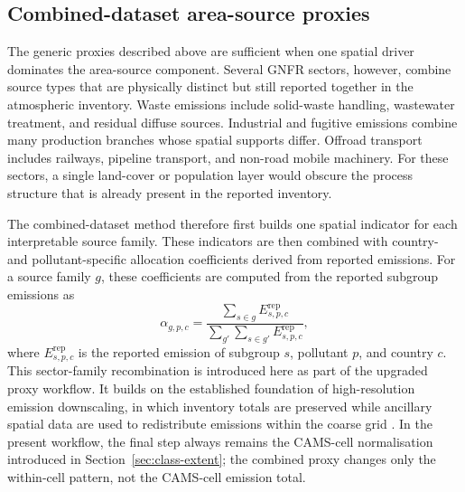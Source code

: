 \subsection{Combined-dataset area-source proxies}
\label{sec:combined-area-proxies}

The generic proxies described above are sufficient when one spatial
driver dominates the area-source component. Several GNFR sectors,
however, combine source types that are physically distinct but still
reported together in the atmospheric inventory. Waste emissions include
solid-waste handling, wastewater treatment, and residual diffuse sources.
Industrial and fugitive emissions combine many production branches whose
spatial supports differ. Offroad transport includes railways, pipeline
transport, and non-road mobile machinery. For these sectors, a single
land-cover or population layer would obscure the process structure that
is already present in the reported inventory.

The combined-dataset method therefore first builds one spatial indicator
for each interpretable source family. These indicators are then combined
with country- and pollutant-specific allocation coefficients derived from
reported emissions. For a source family $g$, these coefficients are
computed from the reported subgroup emissions as
\begin{equation}
  \alpha_{g,p,c} =
  \frac{\displaystyle\sum_{s \in g} E_{s,p,c}^{\mathrm{rep}}}
       {\displaystyle\sum_{g'}\sum_{s \in g'} E_{s,p,c}^{\mathrm{rep}}},
  \label{eq:combined-alpha-aggregation}
\end{equation}
where $E_{s,p,c}^{\mathrm{rep}}$ is the reported emission of subgroup
$s$, pollutant $p$, and country $c$. This sector-family recombination is
introduced here as part of the upgraded proxy workflow. It builds on the
established foundation of high-resolution emission downscaling, in which
inventory totals are preserved while ancillary spatial data are used to
redistribute emissions within the coarse grid
\citep{UrbEm2021,NAEI2024Spatial}. In the present workflow, the final
step always remains the CAMS-cell normalisation introduced in
Section~\ref{sec:class-extent}; the combined proxy changes only the
within-cell pattern, not the CAMS-cell emission total.

